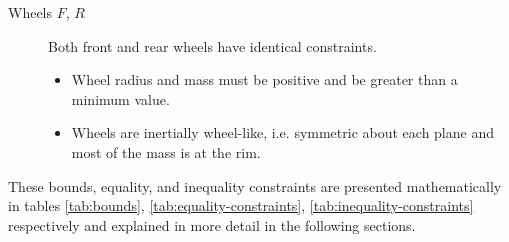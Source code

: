 \documentclass{bmd2019a}
\begin{document}
\begin{description}
  \item[Wheels $F$, $R$] Both front and rear wheels have identical constraints.
    \begin{itemize}
      \item Wheel radius and mass must be positive and be greater than a
        minimum value.
      \item Wheels are inertially wheel-like, i.e. symmetric about each plane
        and most of the mass is at the rim.
    \end{itemize}

\end{description}

These bounds, equality, and inequality constraints are presented mathematically
in tables \ref{tab:bounds}, \ref{tab:equality-constraints},
\ref{tab:inequality-constraints} respectively and explained in more detail in
the following sections.
%
\end{document}
